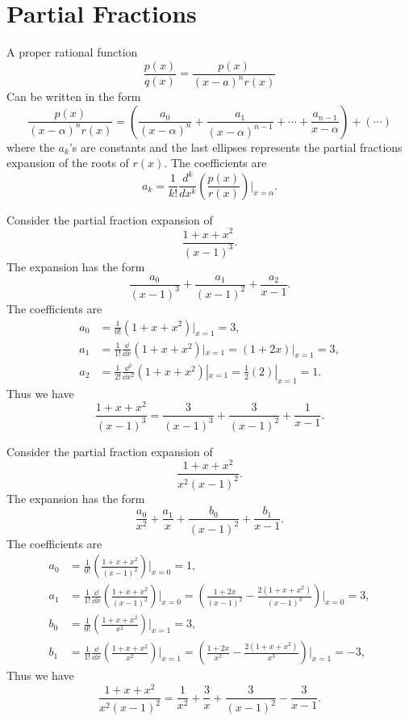 \raggedbottom
\chapter{Partial Fractions}
\flushbottom





A proper rational function
\[
\frac{p(x)}{q(x)} = \frac{p(x)}{(x-a)^n r(x)}
\]
Can be written in the form
\[
\frac{p(x)}{(x-\alpha)^n r(x)} = \left( \frac{a_0}{(x-\alpha)^n} 
  + \frac{a_1}{(x-\alpha)^{n-1}} + \cdots + \frac{a_{n-1}}{x-\alpha}
\right) + (\cdots)
\]
where the $a_k$'s are constants and the last ellipses represents the 
partial fractions expansion of the roots of $r(x)$.  The coefficients are
\[
a_k = \frac{1}{k!} \frac{d^k}{d x^k} 
\left( \frac{p(x)}{r(x)} \right) \bigg|_{x=\alpha}.
\]



\begin{Example}
  Consider the partial fraction expansion of 
  \[
  \frac{1+x+x^2}{(x-1)^3}.
  \]
  The expansion has the form
  \[
  \frac{a_0}{(x-1)^3} + \frac{a_1}{(x-1)^2} + \frac{a_2}{x-1}.
  \]
  The coefficients are
  \begin{align*}
    a_0     &= \frac{1}{0!} (1+x+x^2)|_{x=1} = 3, \\
    a_1     &= \frac{1}{1!} \frac{\dd}{\dd x}(1+x+x^2)|_{x=1} 
    = (1+2x)|_{x=1} = 3, \\
    a_2     &= \frac{1}{2!} \frac{\dd^2}{\dd x^2}(1+x+x^2)|_{x=1} 
    = \frac{1}{2} (2)|_{x=1} = 1.
  \end{align*}
  Thus we have
  \[
  \frac{1+x+x^2}{(x-1)^3} = \frac{3}{(x-1)^3} + \frac{3}{(x-1)^2} 
  + \frac{1}{x-1}.
  \]
\end{Example}



\begin{Example}
  Consider the partial fraction expansion of 
  \[
  \frac{1+x+x^2}{x^2 (x-1)^2}.
  \]
  The expansion has the form
  \[
  \frac{a_0}{x^2} + \frac{a_1}{x} + \frac{b_0}{(x-1)^2} + \frac{b_1}{x-1}.
  \]
  The coefficients are
  \begin{align*}
    a_0     &= \frac{1}{0!} \left( \frac{1+x+x^2}{(x-1)^2} \right)
    \bigg|_{x=0} = 1, \\
    a_1     &= \frac{1}{1!} \frac{\dd}{\dd x} 
    \left( \frac{1+x+x^2}{(x-1)^2} \right) \bigg|_{x=0} 
    = \left( \frac{1+2x}{(x-1)^2} 
      - \frac{2(1+x+x^2)}{(x-1)^3} \right) \bigg|_{x=0}
    = 3, \\
    b_0     &= \frac{1}{0!} \left( \frac{1+x+x^2}{x^2} \right)
    \bigg|_{x=1} = 3, \\
    b_1     &= \frac{1}{1!} \frac{\dd}{\dd x} 
    \left( \frac{1+x+x^2}{x^2} \right) \bigg|_{x=1} 
    = \left( \frac{1+2x}{x^2} 
      - \frac{2(1+x+x^2)}{x^3} \right) \bigg|_{x=1}
    = -3, 
  \end{align*}
  Thus we have
  \[
  \frac{1+x+x^2}{x^2 (x-1)^2} = \frac{1}{x^2} + \frac{3}{x} 
  + \frac{3}{(x-1)^2} - \frac{3}{x-1}.
  \]
\end{Example}





